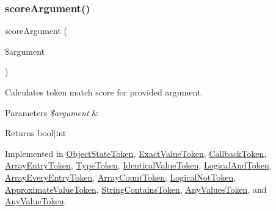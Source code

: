 \subsubsection{\texorpdfstring{score\+Argument()}{scoreArgument()}}
{\footnotesize\ttfamily score\+Argument (\begin{DoxyParamCaption}\item[{}]{\$argument }\end{DoxyParamCaption})}

Calculates token match score for provided argument.


\begin{DoxyParams}{Parameters}
{\em \$argument} & \\
\hline
\end{DoxyParams}
\begin{DoxyReturn}{Returns}
bool$\vert$int 
\end{DoxyReturn}


Implemented in \mbox{\hyperlink{class_prophecy_1_1_argument_1_1_token_1_1_object_state_token_a8d5bf47ab6eaa935458d5ad160e52822}{Object\+State\+Token}}, \mbox{\hyperlink{class_prophecy_1_1_argument_1_1_token_1_1_exact_value_token_a8d5bf47ab6eaa935458d5ad160e52822}{Exact\+Value\+Token}}, \mbox{\hyperlink{class_prophecy_1_1_argument_1_1_token_1_1_callback_token_a8d5bf47ab6eaa935458d5ad160e52822}{Callback\+Token}}, \mbox{\hyperlink{class_prophecy_1_1_argument_1_1_token_1_1_array_entry_token_a8d5bf47ab6eaa935458d5ad160e52822}{Array\+Entry\+Token}}, \mbox{\hyperlink{class_prophecy_1_1_argument_1_1_token_1_1_type_token_a8d5bf47ab6eaa935458d5ad160e52822}{Type\+Token}}, \mbox{\hyperlink{class_prophecy_1_1_argument_1_1_token_1_1_identical_value_token_a8d5bf47ab6eaa935458d5ad160e52822}{Identical\+Value\+Token}}, \mbox{\hyperlink{class_prophecy_1_1_argument_1_1_token_1_1_logical_and_token_a8d5bf47ab6eaa935458d5ad160e52822}{Logical\+And\+Token}}, \mbox{\hyperlink{class_prophecy_1_1_argument_1_1_token_1_1_array_every_entry_token_a8d5bf47ab6eaa935458d5ad160e52822}{Array\+Every\+Entry\+Token}}, \mbox{\hyperlink{class_prophecy_1_1_argument_1_1_token_1_1_array_count_token_a8d5bf47ab6eaa935458d5ad160e52822}{Array\+Count\+Token}}, \mbox{\hyperlink{class_prophecy_1_1_argument_1_1_token_1_1_logical_not_token_a8d5bf47ab6eaa935458d5ad160e52822}{Logical\+Not\+Token}}, \mbox{\hyperlink{class_prophecy_1_1_argument_1_1_token_1_1_approximate_value_token_a8d5bf47ab6eaa935458d5ad160e52822}{Approximate\+Value\+Token}}, \mbox{\hyperlink{class_prophecy_1_1_argument_1_1_token_1_1_string_contains_token_a8d5bf47ab6eaa935458d5ad160e52822}{String\+Contains\+Token}}, \mbox{\hyperlink{class_prophecy_1_1_argument_1_1_token_1_1_any_values_token_a8d5bf47ab6eaa935458d5ad160e52822}{Any\+Values\+Token}}, and \mbox{\hyperlink{class_prophecy_1_1_argument_1_1_token_1_1_any_value_token_a8d5bf47ab6eaa935458d5ad160e52822}{Any\+Value\+Token}}.



